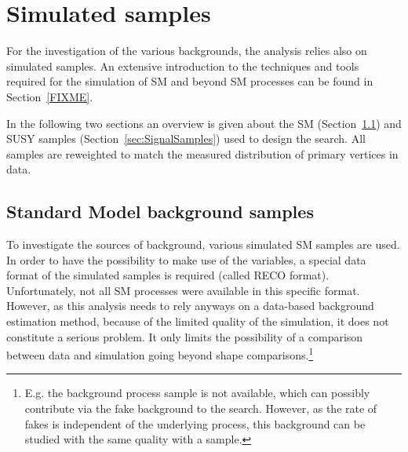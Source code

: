 \newpage
\chapter{Simulated samples}
\label{sec:SimulatedSamples}

For the investigation of the various backgrounds, the analysis relies also on simulated samples.
An extensive introduction to the techniques and tools required for the simulation of SM and beyond SM processes can be found in Section~\ref{FIXME}.

In the following two sections an overview is given about the SM (Section~\ref{sec:SMSamples}) and SUSY samples (Section~\ref{sec:SignalSamples}) used to design the search.
All samples are reweighted to match the measured distribution of primary vertices in data.

\section{Standard Model background samples}
\label{sec:SMSamples}
To investigate the sources of background, various simulated SM samples are used.
In order to have the possibility to make use of the \dedx variables, a special data format of the simulated samples is required (called RECO format).
Unfortunately, not all SM processes were available in this specific format.
However, as this analysis needs to rely anyways on a data-based background estimation method, because of the limited quality of the \dedx simulation,
it does not constitute a serious problem.
It only limits the possibility of a comparison between data and simulation going beyond shape comparisons.\footnote{E.g. the background process \ZInvJets sample is not available, which can possibly contribute via the fake background to the search. However, as the rate of fakes is independent of the underlying process, this background can be studied with the same quality with a \WJets sample.}

